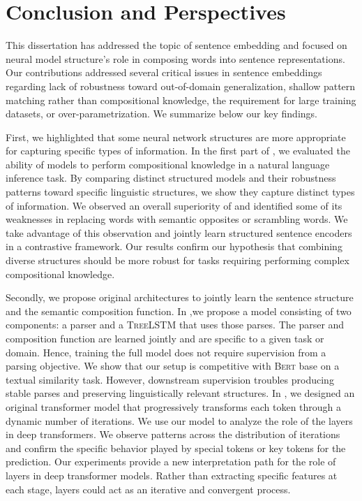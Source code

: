 \setchapterpreamble[u]{\margintoc}
\chapter{Conclusion and Perspectives}


This dissertation has addressed the topic of sentence embedding and focused on neural model structure's role in composing words into sentence representations. Our contributions addressed several critical issues in sentence embeddings regarding lack of robustness toward out-of-domain generalization, shallow pattern matching rather than compositional knowledge, the requirement for large training datasets, or over-parametrization. We summarize below our key findings.

First, we highlighted that some neural network structures are more appropriate for capturing specific types of information. In the first part of , we evaluated the ability of models to perform compositional knowledge in a natural language inference task. By comparing distinct structured models and their robustness patterns toward specific linguistic structures, we show they capture distinct types of information. We observed an overall superiority of \bert and identified some of its weaknesses in replacing words with semantic opposites or scrambling words. We take advantage of this observation and jointly learn structured sentence encoders in a contrastive framework. Our results confirm our hypothesis that combining diverse structures should be more robust for tasks requiring performing complex compositional knowledge.

Secondly, we propose original architectures to jointly learn the sentence structure and the semantic composition function. In ,we propose a model consisting of two components: a parser and a \textsc{TreeLSTM} that uses those parses. The parser and composition function are learned jointly and are specific to a given task or domain. Hence, training the full model does not require supervision from a parsing objective. We show that our setup is competitive with \textsc{Bert} base on a textual similarity task. However, downstream supervision troubles producing stable parses and preserving linguistically relevant structures. In , we designed an original transformer model that progressively transforms each token through a dynamic number of iterations. We use our model to analyze the role of the layers in deep transformers. We observe patterns across the distribution of iterations and confirm the specific behavior played by special tokens or key tokens for the prediction. Our experiments provide a new interpretation path for the role of layers in deep transformer models. Rather than extracting specific features at each stage, layers could act as an iterative and convergent process.

